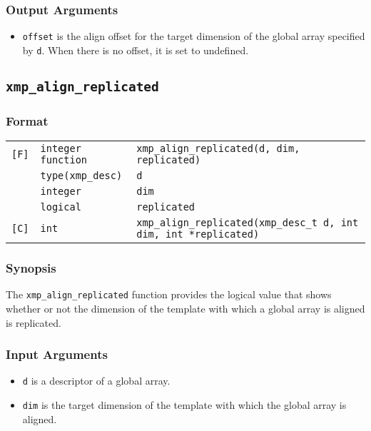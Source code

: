 \subsubsection*{Output Arguments}
\begin{itemize}
 \item {\tt offset} is the align offset for the target dimension of the
       global array specified by {\tt d}. When there is no offset, it is
       set to undefined.
\end{itemize}


\subsection{\tt xmp\_align\_replicated}

\subsubsection*{Format}

\begin{tabular}{lll}

\verb![F]!& {\tt integer function}& {\tt xmp\_align\_replicated(d, dim, replicated)}\\
          & {\tt type(xmp\_desc)} & {\tt d}\\
          & {\tt integer} & {\tt dim}\\
          & {\tt logical} & {\tt replicated}\\

\verb![C]!&  {\tt int}& {\tt xmp\_align\_replicated(xmp\_desc\_t d, int dim, int *replicated)}\\

\end{tabular}

\subsubsection*{Synopsis}

The {\tt xmp\_align\_replicated} function provides the logical value
that shows whether or not the dimension of the template with which a global
array is aligned is replicated. 


\subsubsection*{Input Arguments}
\begin{itemize}
 \item {\tt d} is a descriptor of a global array.
 \item {\tt dim} is the target dimension of the template with which the
       global array is aligned.
\end{itemize}


